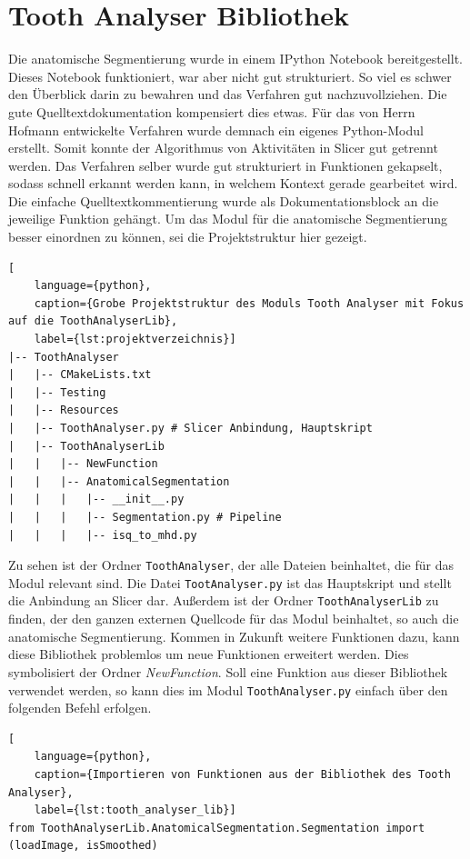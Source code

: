 \section{Tooth Analyser Bibliothek}
Die anatomische Segmentierung wurde in einem IPython Notebook bereitgestellt. Dieses
Notebook funktioniert, war aber nicht gut strukturiert. So viel es schwer den Überblick
darin zu bewahren und das Verfahren gut nachzuvollziehen. Die gute
Quelltextdokumentation kompensiert dies etwas. Für das von Herrn Hofmann entwickelte
Verfahren wurde demnach ein eigenes Python-Modul erstellt. Somit konnte der
Algorithmus von Aktivitäten in Slicer gut getrennt werden. Das Verfahren selber wurde
gut strukturiert in Funktionen gekapselt, sodass schnell erkannt werden kann, in
welchem Kontext gerade gearbeitet wird. Die einfache Quelltextkommentierung
wurde als Dokumentationsblock an die jeweilige Funktion gehängt. Um das Modul für
die anatomische Segmentierung besser einordnen zu können, sei die
Projektstruktur hier gezeigt.

\begin{lstlisting}[
    language={python},
    caption={Grobe Projektstruktur des Moduls Tooth Analyser mit Fokus auf die ToothAnalyserLib},
    label={lst:projektverzeichnis}]
|-- ToothAnalyser
|   |-- CMakeLists.txt
|   |-- Testing
|   |-- Resources
|   |-- ToothAnalyser.py # Slicer Anbindung, Hauptskript
|   |-- ToothAnalyserLib
|   |   |-- NewFunction
|   |   |-- AnatomicalSegmentation
|   |   |   |-- __init__.py
|   |   |   |-- Segmentation.py # Pipeline
|   |   |   |-- isq_to_mhd.py
\end{lstlisting}

Zu sehen ist der Ordner \texttt{ToothAnalyser}, der alle Dateien beinhaltet, die
für das Modul relevant sind. Die Datei \texttt{TootAnalyser.py} ist das
Hauptskript und stellt die Anbindung an Slicer dar. Außerdem ist der Ordner \texttt{ToothAnalyserLib}
zu finden, der den ganzen externen Quellcode für das Modul beinhaltet, so auch
die anatomische Segmentierung. Kommen in Zukunft weitere Funktionen dazu, kann
diese Bibliothek problemlos um neue Funktionen erweitert werden. Dies symbolisiert
der Ordner \textsl{NewFunction}. Soll eine Funktion aus dieser Bibliothek verwendet
werden, so kann dies im Modul \texttt{ToothAnalyser.py} einfach über den folgenden
Befehl erfolgen.

\begin{lstlisting}[
    language={python},
    caption={Importieren von Funktionen aus der Bibliothek des Tooth Analyser},
    label={lst:tooth_analyser_lib}]
from ToothAnalyserLib.AnatomicalSegmentation.Segmentation import (loadImage, isSmoothed)
\end{lstlisting}

